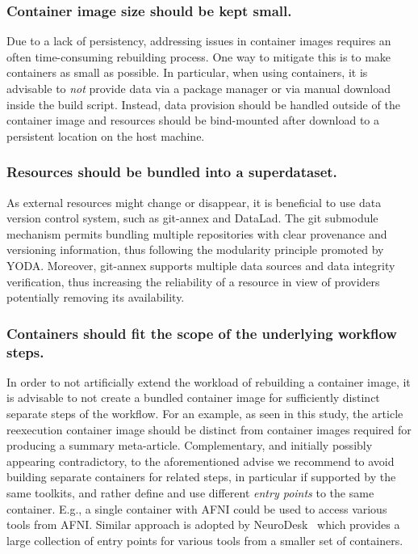 \subsubsection{Container image size should be kept small.}
Due to a lack of persistency, addressing issues in container images requires an often time-consuming rebuilding process.
One way to mitigate this is to make containers as small as possible.
In particular, when using containers, it is advisable to \textit{not} provide data via a package manager or via manual download inside the build script.
Instead, data provision should be handled outside of the container image and resources should be bind-mounted after download to a persistent location on the host machine.

\subsubsection{Resources should be bundled into a superdataset.}
As external resources might change or disappear, it is beneficial to use data version control system, such as git-annex and DataLad.
The git submodule mechanism permits bundling multiple repositories with clear provenance and versioning information, thus following the modularity principle promoted by YODA.
Moreover, git-annex supports multiple data sources and data integrity verification, thus increasing the reliability of a resource in view of providers potentially removing its availability.

\subsubsection{Containers should fit the scope of the underlying workflow steps.}
In order to not artificially extend the workload of rebuilding a container image, it is advisable to not create a bundled container image for sufficiently distinct separate steps of the workflow.
For an example, as seen in this study, the article reexecution container image should be distinct from container images required for producing a summary meta-article.
Complementary, and initially possibly appearing contradictory, to the aforementioned advise we recommend to avoid building separate containers for related steps, in particular if supported by the same toolkits, and rather define and use different \emph{entry points} to the same container.
E.g., a single container with AFNI could be used to access various tools from AFNI.
Similar approach is adopted by NeuroDesk~\cite{neurodesk} which provides a large collection of entry points for various tools from a smaller set of containers.

